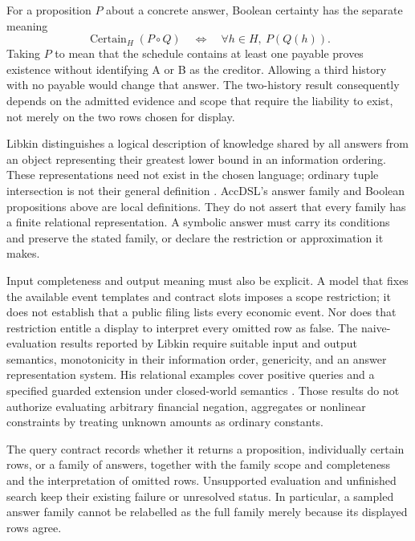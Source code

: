For a proposition $P$ about a concrete answer, Boolean certainty has the
separate meaning
\[
 \operatorname{Certain}_H(P\circ Q)
 \quad\Longleftrightarrow\quad
 \forall h\in H,\ P(Q(h)).
\]
Taking $P$ to mean that the schedule contains at least one payable proves
existence without identifying A or B as the creditor. Allowing a third history
with no payable would change that answer. The two-history result consequently
depends on the admitted evidence and scope that require the liability to
exist, not merely on the two rows chosen for display.

Libkin distinguishes a logical description of knowledge shared by all
answers from an object representing their greatest lower bound in an
information ordering. These representations need not exist in the chosen
language; ordinary tuple intersection is not their general definition
\citep[Section~5.3, equations~(6)--(8)]{libkin2014}. AccDSL's answer family and
Boolean propositions above are local definitions. They do not assert that
every family has a finite relational representation. A symbolic answer must
carry its conditions and preserve the stated family, or declare the
restriction or approximation it makes.

Input completeness and output meaning must also be explicit. A model that
fixes the available event templates and contract slots imposes a scope
restriction; it does not establish that a public filing lists every economic
event. Nor does that restriction entitle a display to interpret every omitted
row as false. The naive-evaluation results reported by Libkin require suitable input and
output semantics, monotonicity in their information order, genericity, and an
answer representation system. His relational examples cover positive queries
and a specified guarded extension under closed-world semantics
\citep[Sections~6.1--6.2, equations~(9)--(10)]{libkin2014}. Those results do not
authorize evaluating arbitrary financial negation, aggregates or nonlinear
constraints by treating unknown amounts as ordinary constants.

The query contract records whether it returns a proposition, individually
certain rows, or a family of answers, together with the family scope and
completeness and the interpretation of omitted rows. Unsupported evaluation
and unfinished search keep their existing failure or unresolved status. In
particular, a sampled answer family cannot be relabelled as the full family
merely because its displayed rows agree.
